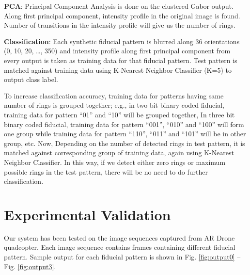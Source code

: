 \documentclass[runningheads]{llncs}
\begin{document}
\textbf{PCA}: Principal Component Analysis is done on the clustered Gabor
output. Along first principal component, intensity profile in the original image
is found. Number of transitions in the intensity profile will give us the
number of rings.

\textbf{Classification}: Each synthetic fiducial pattern is blurred along 36
orientations (0, 10, 20, \ldots , 350) and intensity profile along first
principal component from every output is taken as training data for that
fiducial pattern. Test pattern is matched against training data using 
K-Nearest Neighbor Classifier (K=5) to output class label.

To increase classification accuracy, training data for patterns having same
number of rings is grouped together; e.g., in two bit binary coded fiducial,
training data for pattern ``01'' and ``10'' will be grouped together, In three
bit binary coded fiducial, training data for pattern “001”, “010” and “100” will
form one group while training data for pattern “110”, “011” and “101” will be
in other group, etc. Now, Depending on the number of detected rings in test
pattern, it is matched against corresponding group of training data, again
using  K-Nearest Neighbor Classifier. In this way, if we detect either zero
rings or maximum possible rings in the test pattern, there will be no need to do
further classification.

\section{Experimental Validation}

Our system has been tested on the image sequences captured from AR Drone
quadcopter. Each image sequence contains frames containing different fiducial
pattern. Sample output for each fiducial pattern is shown in Fig.
\ref{fig:output0} -- Fig. \ref{fig:output3}.
\end{document}
